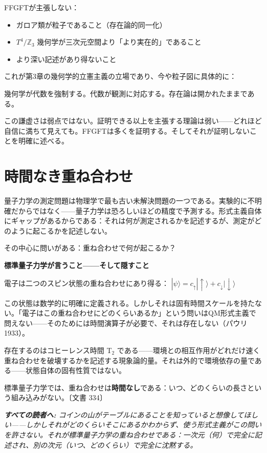 \documentclass[11pt,openany]{book}
\newenvironment{laierspur}{%
  \par\vspace{4pt}%
  \noindent\small\itshape\color{blue!60!black}%
  \textbf{すべての読者へ:}\enspace\ignorespaces}{%
  \par\vspace{4pt}\normalsize\normalfont\normalcolor}
\begin{document}
FFGFTが主張しない：
\begin{itemize}
\item ガロア類が粒子であること（存在論的同一化）
\item $T^4/\mathbb{Z}_3$ 幾何学が三次元空間より「より実在的」であること
\item より深い記述があり得ないこと
\end{itemize}

これが第3章の幾何学的立憲主義の立場であり、今や粒子図に具体的に：

幾何学が代数を強制する。代数が観測に対応する。存在論は開かれたままである。

この謙虚さは弱点ではない。証明できる以上を主張する理論は弱い——どれほど自信に満ちて見えても。FFGFTは多くを証明する。そしてそれが証明しないことを明確に述べる。

\medskip

\chapter{時間なき重ね合わせ}

量子力学の測定問題は物理学で最も古い未解決問題の一つである。実験的に不明確だからではなく——量子力学は恐ろしいほどの精度で予測する。形式主義自体にギャップがあるからである：それは何が測定されるかを記述するが、測定がどのように起こるかを記述しない。

その中心に問いがある：重ね合わせで何が起こるか？

\textbf{標準量子力学が言うこと——そして隠すこと}

電子は二つのスピン状態の重ね合わせにあり得る：
$|\psi\rangle = c_\uparrow|\uparrow\rangle + c_\downarrow|\downarrow\rangle$

この状態は数学的に明確に定義される。しかしそれは固有時間スケールを持たない。「電子はこの重ね合わせにどのくらいあるか」という問いはQM形式主義で問えない——そのためには時間演算子が必要で、それは存在しない（パウリ1933）。

存在するのはコヒーレンス時間 T$_2$ である——環境との相互作用がどれだけ速く重ね合わせを破壊するかを記述する現象論的量。それは外的で環境依存の量である——状態自体の固有性質ではない。

標準量子力学では、重ね合わせは\textbf{時間なし}である：いつ、どのくらいの長さという組み込みがない。〔文書 334〕

\begin{laierspur}
コインの山がテーブルにあることを知っていると想像してほしい——しかしそれがどのくらいそこにあるかわからず、使う形式主義がこの問いを許さない。それが標準量子力学の重ね合わせである：一次元（何）で完全に記述され、別の次元（いつ、どのくらい）で完全に沈黙する。
\end{laierspur}
\end{document}
